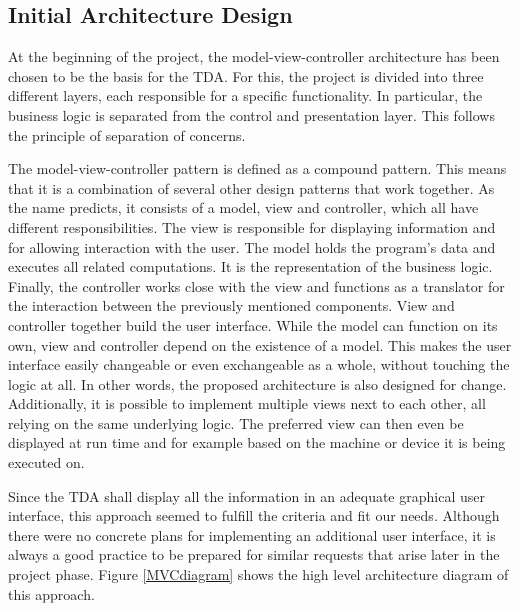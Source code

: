 \subsection{Initial Architecture Design}
At the beginning of the project, the model-view-controller architecture has been chosen to be the basis for the TDA. For this, the project is divided into three different layers, each responsible for a specific functionality. In particular, the business logic is separated from the control and presentation layer. This follows the principle of separation of concerns.

The model-view-controller pattern is defined as a compound pattern. This means that it is a combination of several other design patterns that work together. As the name predicts, it consists of a model, view and controller, which all have different responsibilities. The view is responsible for displaying information and for allowing interaction with the user. The model holds the program's data and executes all related computations. It is the representation of the business logic. Finally, the controller works close with the view and functions as a translator for the interaction between the previously mentioned components. View and controller together build the user interface.
While the model can function on its own, view and controller depend on the existence of a model. This makes the user interface easily changeable or even exchangeable as a whole, without touching the logic at all. In other words, the proposed architecture is also designed for change. Additionally, it is possible to implement multiple views next to each other, all relying on the same underlying logic. The preferred view can then even be displayed at run time and for example based on the machine or device it is being executed on.

Since the TDA shall display all the information in an adequate graphical user interface, this approach seemed to fulfill the criteria and fit our needs. Although there were no concrete plans for implementing an additional user interface, it is always a good practice to be prepared for similar requests that arise later in the project phase. Figure \ref{MVCdiagram} shows the high level architecture diagram of this approach.

